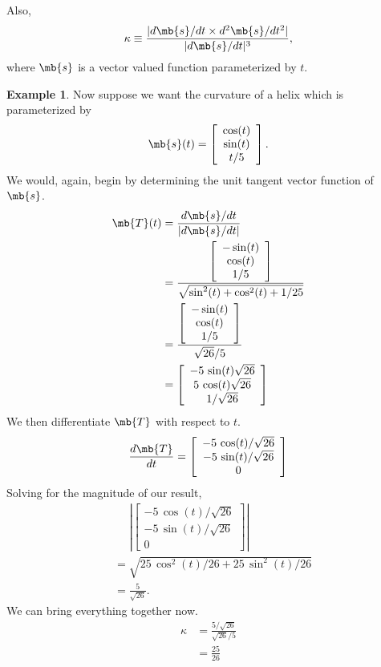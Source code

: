 \documentclass[11pt]{article}
\theoremstyle{definition}
\newtheorem{ex}{Example}[section]
\begin{document}
Also,
$$
\kappa \equiv \frac{| d \mb{s}/ d t\times d ^2\mb{s}/ d t^2|}{| d \mb{s}/ d t|^3},
$$
where $\mb{s}$ is a vector valued function parameterized by $t$.


\begin{ex}Now suppose we want the curvature of a helix which is parameterized by
$$
\mb{s}(t) = \left[\begin{array}{c}\cos(t) \\\sin(t)\\{t/5}\end{array}\right].
$$
We would, again, begin by determining the unit tangent vector function of $\mb{s}$.
\begin{align*}
\mb{T}(t) &= \frac{ d \mb{s}/ d t}{| d \mb{s}/ d t|}\\
&= \frac{\left[\begin{array}{c}-\sin(t) \\\cos(t)\\{1/5}\end{array}\right]}{\sqrt{\sin^2(t) + \cos^2(t) + {1/25}}}\\
&= \frac{\left[\begin{array}{c}-\sin(t) \\\cos(t)\\{1/5}\end{array}\right]}{\sqrt{26}/5}\\
&= \left[\begin{array}{c}{-5\,\sin(t)\sqrt{26}} \\5\,\cos(t)\sqrt{26}\\1/\sqrt{26}\end{array}\right]
\end{align*}
We then differentiate $\mb{T}$ with respect to $t$.
$$
\frac{ d \mb{T}}{ d t} = \left[\begin{array}{c}{-5\,\cos(t)/\sqrt{26}} \\{-5\,\sin(t)/\sqrt{26}}\\0\end{array}\right]
$$
Solving for the magnitude of our result,
\begin{align*}
&\phantom{=}\left|\left[\begin{array}{c}{-5\,\cos(t)/\sqrt{26}} \\{-5\,\sin(t)/\sqrt{26}}\\0\end{array}\right]\right|\\
&= \sqrt{{25\, \cos^2(t)/26} + 25\, \sin^2(t)/26}\\
&= \frac{5}{\sqrt{26}}.
\end{align*}
We can bring everything together now.
\begin{align*}
\kappa &= \frac{{5/\sqrt{26}}}{{\sqrt{26}/5}}\\
&= \boxed{\frac{25}{26}}
\end{align*}\end{ex}
\end{document}
